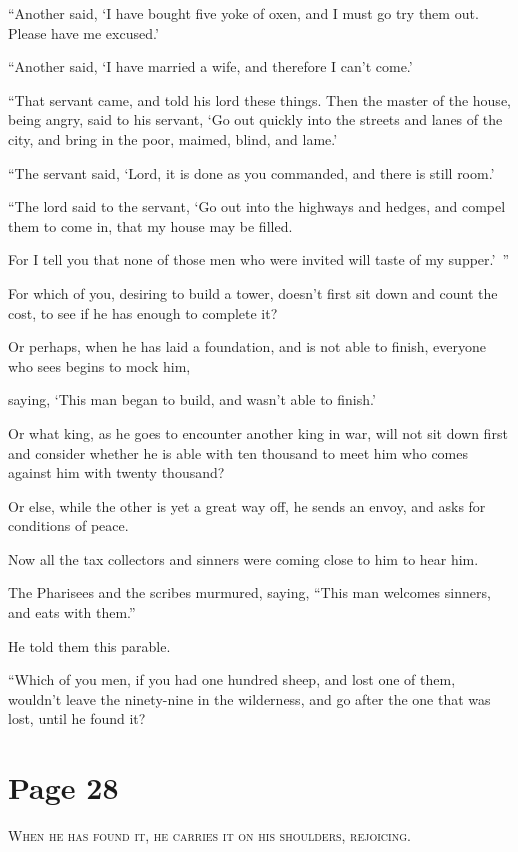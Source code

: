 “Another said, ‘I have bought five yoke of oxen, and I must go try them out. Please have me excused.’

“Another said, ‘I have married a wife, and therefore I can’t come.’

“That servant came, and told his lord these things. Then the master of the house, being angry, said to his servant, ‘Go out quickly into the streets and lanes of the city, and bring in the poor, maimed, blind, and lame.’

“The servant said, ‘Lord, it is done as you commanded, and there is still room.’

“The lord said to the servant, ‘Go out into the highways and hedges, and compel them to come in, that my house may be filled.

For I tell you that none of those men who were invited will taste of my supper.’ ”

For which of you, desiring to build a tower, doesn’t first sit down and count the cost, to see if he has enough to complete it?

Or perhaps, when he has laid a foundation, and is not able to finish, everyone who sees begins to mock him,

saying, ‘This man began to build, and wasn’t able to finish.’

Or what king, as he goes to encounter another king in war, will not sit down first and consider whether he is able with ten thousand to meet him who comes against him with twenty thousand?

Or else, while the other is yet a great way off, he sends an envoy, and asks for conditions of peace.

Now all the tax collectors and sinners were coming close to him to hear him.

The Pharisees and the scribes murmured, saying, “This man welcomes sinners, and eats with them.”

He told them this parable.

“Which of you men, if you had one hundred sheep, and lost one of them, wouldn’t leave the ninety-nine in the wilderness, and go after the one that was lost, until he found it?



\chapterornament
\section*{Page 28}

\lettrine{W}{hen he has found it, he carries it on his shoulders, rejoicing.}

